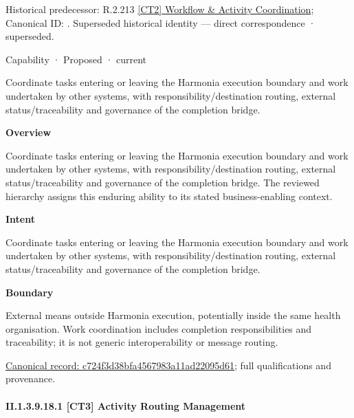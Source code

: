 {\small Historical predecessor: R.2.213 \hyperref[element:4422d865978c4353ad575759c6026d27]{[CT2] Workflow \& Activity Coordination}; Canonical ID: \texttt{}. Superseded historical identity — direct correspondence · superseded.}\par
\label{element:c724f3d38bfa4567983a11ad22095d61}
{\small Capability · Proposed · current}\par

Coordinate tasks entering or leaving the Harmonia execution boundary and work undertaken by other systems, with responsibility/destination routing, external status/traceability and governance of the completion bridge.



\textbf{Overview}



Coordinate tasks entering or leaving the Harmonia execution boundary and work undertaken by other systems, with responsibility/destination routing, external status/traceability and governance of the completion bridge. The reviewed hierarchy assigns this enduring ability to its stated business-enabling context.



\textbf{Intent}



Coordinate tasks entering or leaving the Harmonia execution boundary and work undertaken by other systems, with responsibility/destination routing, external status/traceability and governance of the completion bridge.



\textbf{Boundary}



External means outside Harmonia execution, potentially inside the same health organisation. Work coordination includes completion responsibilities and traceability; it is not generic interoperability or message routing.


{\footnotesize \href{../../../../continuum/strategy/capability/c724f3d38bfa4567983a11ad22095d61.md}{Canonical record: c724f3d38bfa4567983a11ad22095d61}; full qualifications and provenance.}\par
\paragraph*{II.1.3.9.18.1 [CT3] Activity Routing Management}
\label{navigation:II.1.3.9.18.1}

